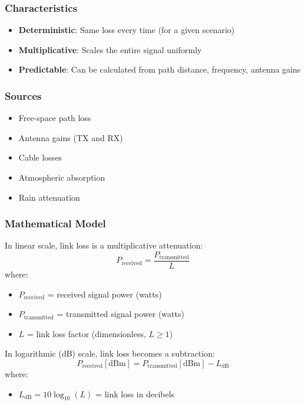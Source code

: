 \subsubsection{Characteristics}\label{characteristics}

\begin{itemize}
\tightlist
\item
  \textbf{Deterministic}: Same loss every time (for a given scenario)
\item
  \textbf{Multiplicative}: Scales the entire signal uniformly
\item
  \textbf{Predictable}: Can be calculated from path distance, frequency,
  antenna gains
\end{itemize}

\subsubsection{Sources}\label{sources}

\begin{itemize}
\tightlist
\item
  Free-space path loss
\item
  Antenna gains (TX and RX)
\item
  Cable losses
\item
  Atmospheric absorption
\item
  Rain attenuation
\end{itemize}

\subsubsection{Mathematical Model}\label{mathematical-model}

In linear scale, link loss is a multiplicative attenuation:
\begin{equation}
P_{\text{received}} = \frac{P_{\text{transmitted}}}{L}
\end{equation}
where:
\begin{itemize}
\item $P_{\text{received}}$ = received signal power (watts)
\item $P_{\text{transmitted}}$ = transmitted signal power (watts)
\item $L$ = link loss factor (dimensionless, $L \geq 1$)
\end{itemize}

In logarithmic (dB) scale, link loss becomes a subtraction:
\begin{equation}
P_{\text{received}} [\text{dBm}] = P_{\text{transmitted}} [\text{dBm}] - L_{\text{dB}}
\end{equation}
where:
\begin{itemize}
\item $L_{\text{dB}} = 10\log_{10}(L)$ = link loss in decibels
\end{itemize}

